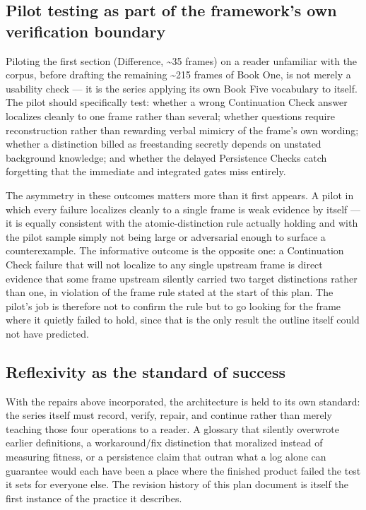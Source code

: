 \documentclass[11pt]{article}
\begin{document}
\subsection*{Pilot testing as part of the framework's own verification boundary}
Piloting the first section (Difference, \textasciitilde35 frames) on a reader unfamiliar with the corpus, before drafting the remaining \textasciitilde215 frames of Book One, is not merely a usability check --- it is the series applying its own Book Five vocabulary to itself. The pilot should specifically test: whether a wrong Continuation Check answer localizes cleanly to one frame rather than several; whether questions require reconstruction rather than rewarding verbal mimicry of the frame's own wording; whether a distinction billed as freestanding secretly depends on unstated background knowledge; and whether the delayed Persistence Checks catch forgetting that the immediate and integrated gates miss entirely.

The asymmetry in these outcomes matters more than it first appears. A pilot in which every failure localizes cleanly to a single frame is weak evidence by itself --- it is equally consistent with the atomic-distinction rule actually holding and with the pilot sample simply not being large or adversarial enough to surface a counterexample. The informative outcome is the opposite one: a Continuation Check failure that will not localize to any single upstream frame is direct evidence that some frame upstream silently carried two target distinctions rather than one, in violation of the frame rule stated at the start of this plan. The pilot's job is therefore not to confirm the rule but to go looking for the frame where it quietly failed to hold, since that is the only result the outline itself could not have predicted.

\subsection*{Reflexivity as the standard of success}
With the repairs above incorporated, the architecture is held to its own standard: the series itself must record, verify, repair, and continue rather than merely teaching those four operations to a reader. A glossary that silently overwrote earlier definitions, a workaround/fix distinction that moralized instead of measuring fitness, or a persistence claim that outran what a log alone can guarantee would each have been a place where the finished product failed the test it sets for everyone else. The revision history of this plan document is itself the first instance of the practice it describes.
\end{document}
